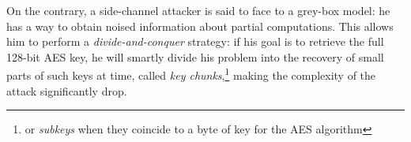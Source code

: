 
On the contrary, a side-channel attacker is said to face to a grey-box model: he has a way to obtain noised information about partial computations. This allows him to perform a \emph{divide-and-conquer} strategy: if his goal is to retrieve the full 128-bit AES key, he will smartly divide his problem into the recovery of small parts of such keys at time, called \emph{key chunks},\footnote{or \emph{subkeys} when they coincide to a byte of key for the AES algorithm} making the complexity of the attack significantly drop. 


